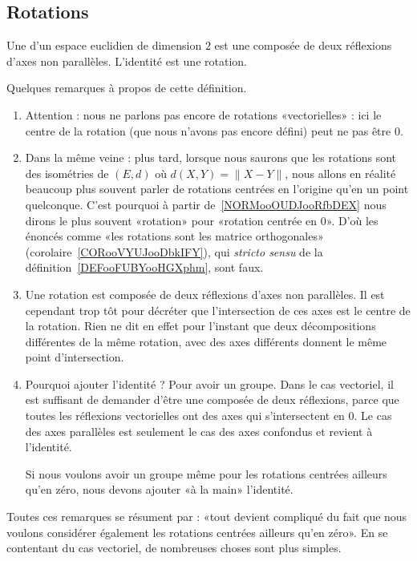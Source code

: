 \subsection{Rotations}

\begin{definition}        \label{DEFooFUBYooHGXphm}
	Une  d'un espace euclidien de dimension \( 2\) est une composée de deux réflexions d'axes non parallèles. L'identité est une rotation.
\end{definition}

\begin{normaltext}
	Quelques remarques à propos de cette définition.
	\begin{enumerate}
		\item
		      Attention : nous ne parlons pas encore de rotations «vectorielles» : ici le centre de la rotation (que nous n'avons pas encore défini) peut ne pas être \( 0\).
		\item
		      Dans la même veine : plus tard, lorsque nous saurons que les rotations sont des isométries de \( (E,d)\) où \( d(X,Y)=\| X-Y \|\), nous allons en réalité beaucoup plus souvent parler de rotations centrées en l'origine qu'en un point quelconque. C'est pourquoi à partir de~\ref{NORMooOUDJooRfbDEX} nous dirons le plus souvent «rotation»  pour «rotation centrée en \( 0\)». D'où les énoncés comme «les rotations sont les matrice orthogonales» (corolaire~\ref{CORooVYUJooDbkIFY}), qui \emph{stricto sensu} de la définition~\ref{DEFooFUBYooHGXphm}, sont faux.
		\item
		      Une rotation est composée de deux réflexions d'axes non parallèles. Il est cependant trop tôt pour décréter que l'intersection de ces axes est le centre de la rotation. Rien ne dit en effet pour l'instant que deux décompositions différentes de la même rotation, avec des axes différents donnent le même point d'intersection.
		\item
		      Pourquoi ajouter l'identité  ? Pour avoir un groupe. Dans le cas vectoriel, il est suffisant de demander d'être une composée de deux réflexions, parce que toutes les réflexions vectorielles ont des axes qui s'intersectent en \( 0\). Le cas des axes parallèles est seulement le cas des axes confondus et revient à l'identité.

		      Si nous voulons avoir un groupe même pour les rotations centrées ailleurs qu'en zéro, nous devons ajouter «à la main» l'identité.
	\end{enumerate}

	Toutes ces remarques se résument par : «tout devient compliqué du fait que nous voulons considérer également les rotations centrées ailleurs qu'en zéro». En se contentant du cas vectoriel, de nombreuses choses sont plus simples.
\end{normaltext}

